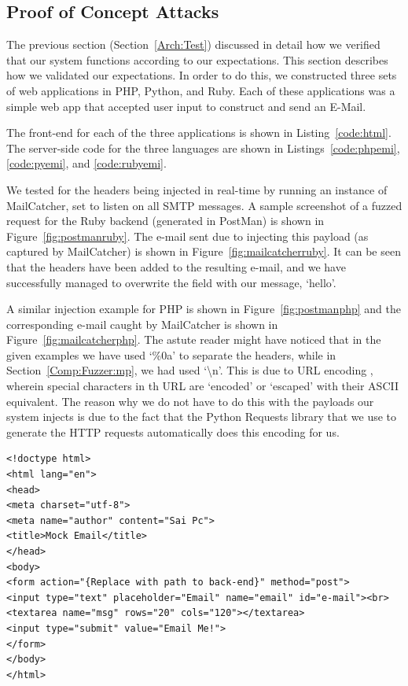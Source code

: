 \subsection{Proof of Concept Attacks}
The previous section (Section~\ref{Arch:Test}) discussed in detail how we verified that our system functions according to our expectations. This section describes how we validated our expectations. In order to do this, we constructed three sets of web applications in PHP, Python, and Ruby. Each of these applications was a simple web app that accepted user input to construct and send an E-Mail.

The front-end for each of the three applications is shown in Listing~\ref{code:html}. The server-side code for the three languages are shown in Listings~\ref{code:phpemi}, \ref{code:pyemi}, and \ref{code:rubyemi}.

We tested for the headers being injected in real-time by running an instance of MailCatcher, set to listen on all SMTP messages. A sample screenshot of a fuzzed request for the Ruby backend (generated in PostMan) is shown in Figure~\ref{fig:postmanruby}. The e-mail sent due to injecting this payload (as captured by MailCatcher) is shown in Figure~\ref{fig:mailcatcherruby}. It can be seen that the headers have been added to the resulting e-mail, and we have successfully managed to overwrite the  field with our message, `hello'.

A similar injection example for PHP is shown in Figure~\ref{fig:postmanphp} and the corresponding e-mail caught by MailCatcher is shown in Figure~\ref{fig:mailcatcherphp}. The astute reader might have noticed that in the given examples we have used `\%0a' to separate the headers, while in Section~\ref{Comp:Fuzzer:mp}, we had used `\textbackslash{}n'. This is due to URL encoding \cite{rfc1738}, wherein special characters in th URL are `encoded' or `escaped' with their ASCII equivalent.
The reason why we do not have to do this with the payloads our system injects is due to the fact that the Python Requests library that we use to generate the HTTP requests automatically does this encoding for us.

\begin{lstlisting}
<!doctype html>
<html lang="en">
<head>
<meta charset="utf-8">
<meta name="author" content="Sai Pc">
<title>Mock Email</title>
</head>
<body>
<form action="{Replace with path to back-end}" method="post">
<input type="text" placeholder="Email" name="email" id="e-mail"><br>
<textarea name="msg" rows="20" cols="120"></textarea>
<input type="submit" value="Email Me!">
</form>
</body>
</html>
\end{lstlisting}

